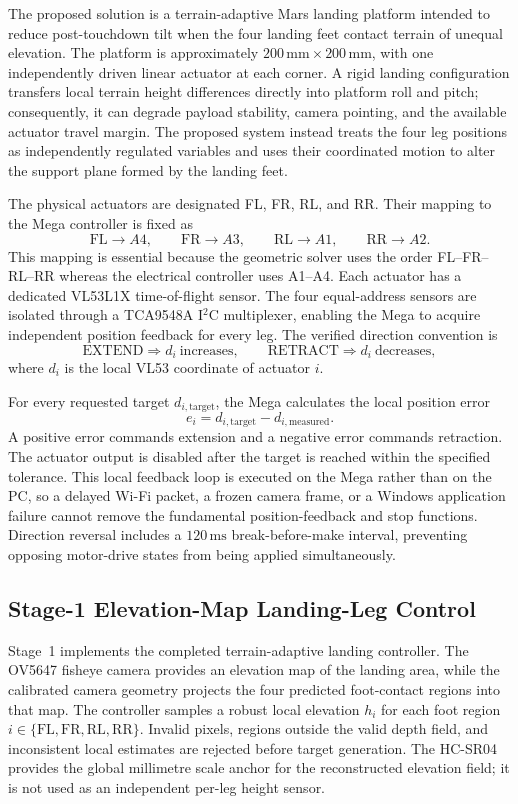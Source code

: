 \documentclass{engr1000j-s2}
\begin{document}
The proposed solution is a terrain-adaptive Mars landing platform intended to reduce post-touchdown tilt when the four landing feet contact terrain of unequal elevation. The platform is approximately $200\,\mathrm{mm}\times200\,\mathrm{mm}$, with one independently driven linear actuator at each corner. A rigid landing configuration transfers local terrain height differences directly into platform roll and pitch; consequently, it can degrade payload stability, camera pointing, and the available actuator travel margin. The proposed system instead treats the four leg positions as independently regulated variables and uses their coordinated motion to alter the support plane formed by the landing feet.

The physical actuators are designated FL, FR, RL, and RR. Their mapping to the Mega controller is fixed as
\[
\mathrm{FL}\rightarrow A4,\qquad
\mathrm{FR}\rightarrow A3,\qquad
\mathrm{RL}\rightarrow A1,\qquad
\mathrm{RR}\rightarrow A2.
\]
This mapping is essential because the geometric solver uses the order FL--FR--RL--RR whereas the electrical controller uses A1--A4. Each actuator has a dedicated VL53L1X time-of-flight sensor. The four equal-address sensors are isolated through a TCA9548A I$^2$C multiplexer, enabling the Mega to acquire independent position feedback for every leg. The verified direction convention is
\[
\text{EXTEND}\Rightarrow d_i\ \text{increases},
\qquad
\text{RETRACT}\Rightarrow d_i\ \text{decreases},
\]
where $d_i$ is the local VL53 coordinate of actuator $i$.

For every requested target $d_{i,\mathrm{target}}$, the Mega calculates the local position error
\[
e_i=d_{i,\mathrm{target}}-d_{i,\mathrm{measured}}.
\]
A positive error commands extension and a negative error commands retraction. The actuator output is disabled after the target is reached within the specified tolerance. This local feedback loop is executed on the Mega rather than on the PC, so a delayed Wi-Fi packet, a frozen camera frame, or a Windows application failure cannot remove the fundamental position-feedback and stop functions. Direction reversal includes a $120\,\mathrm{ms}$ break-before-make interval, preventing opposing motor-drive states from being applied simultaneously.

\subsection*{Stage-1 Elevation-Map Landing-Leg Control}

Stage~1 implements the completed terrain-adaptive landing controller. The OV5647 fisheye camera provides an elevation map of the landing area, while the calibrated camera geometry projects the four predicted foot-contact regions into that map. The controller samples a robust local elevation $h_i$ for each foot region $i\in\{\mathrm{FL},\mathrm{FR},\mathrm{RL},\mathrm{RR}\}$. Invalid pixels, regions outside the valid depth field, and inconsistent local estimates are rejected before target generation. The HC-SR04 provides the global millimetre scale anchor for the reconstructed elevation field; it is not used as an independent per-leg height sensor.
\end{document}
